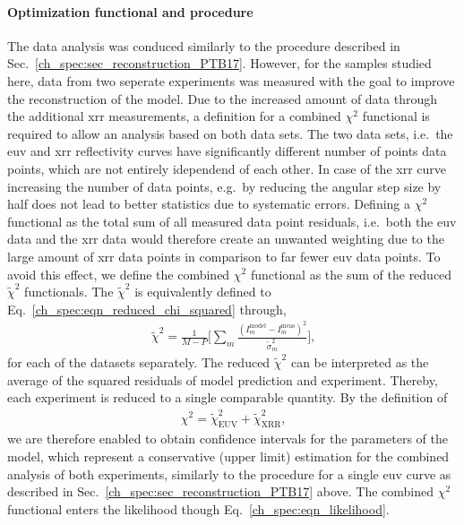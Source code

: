 \paragraph{Optimization functional and procedure} \label{ch_spec:sec_MoSi_euv_xrr_combined}
The data analysis was conduced similarly to the procedure described in Sec.~\ref{ch_spec:sec_reconstruction_PTB17}. However, for the samples studied here, data from two seperate experiments was measured with the goal to improve the reconstruction of the model. Due to the increased amount of data through the additional \gls{xrr} measurements, a definition for a combined $\chi^2$ functional is required to allow an analysis based on both data sets. The two data sets, i.e.~the \gls{euv} and \gls{xrr} reflectivity curves have significantly different number of points data points, which are not entirely idependend of each other. In case of the \gls{xrr} curve increasing the number of data points, e.g.~by reducing the angular step size by half does not lead to better statistics due to systematic errors. Defining a $\chi^2$ functional as the total sum of all measured data point residuals, i.e.~both the \gls{euv} data and the \gls{xrr} data would therefore create an unwanted weighting due to the large amount of \gls{xrr} data points in comparison to far fewer \gls{euv} data points. To avoid this effect, we define the combined $\chi^2$ functional as the sum of the reduced $\tilde{\chi}^2$ functionals. The $\tilde{\chi}^2$ is equivalently defined to Eq.~\eqref{ch_spec:eqn_reduced_chi_squared} through,\begin{align}
\tilde{\chi}^2 = \frac{1}{M-P} \bigg[\sum\limits_{m} \frac{(I_m^\text{model} 
- I_m^\text{meas})^2}{\tilde{\sigma}_m^2} \bigg] \text{,}
\end{align}
for each of the datasets separately. The reduced $\tilde{\chi}^2$ can be interpreted as the average of the squared residuals of model prediction and experiment. Thereby, each experiment is reduced to a single comparable quantity. By the definition of
\begin{align}
\chi^2 = \tilde{\chi}^2_\text{EUV} +\tilde{\chi}^2_\text{XRR} \text{,}
\label{ch_spec:eqn_Mo_Si_C_total_chi_2}
\end{align}
we are therefore enabled to obtain confidence intervals for the parameters of the model, which represent a conservative (upper limit) estimation for the combined analysis of both experiments, similarly to the procedure for a single \gls{euv} curve as described in Sec.~\ref{ch_spec:sec_reconstruction_PTB17} above. The combined $\chi^2$ functional enters the likelihood though Eq.~\ref{ch_spec:eqn_likelihood}.

